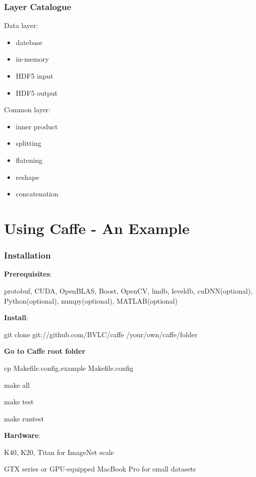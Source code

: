 \documentclass{beamer}
\begin{document}
\begin{frame}
\frametitle{Layer Catalogue}
Data layer:
\begin{itemize}
\item datebase
\item in-memory
\item HDF5 input
\item HDF5 output
\end{itemize}
Common layer:
\begin{itemize}
\item inner product
\item splitting
\item flatening
\item reshape
\item concatenation
\end{itemize}
\end{frame}

\section{Using Caffe - An Example}
\begin{frame}
\frametitle{Installation}
\textbf{Prerequisites}:\par
\hspace{30pt}protobuf, CUDA, OpenBLAS, Boost, OpenCV, lmdb, leveldb, cuDNN(optional), Python(optional), numpy(optional), MATLAB(optional)\par
\vspace{5pt}
\textbf{Install}:\par
\hspace{30pt}git clone git://github.com/BVLC/caffe /your/own/caffe/folder\par
\vspace{5pt}
\textbf{Go to Caffe root folder}\par
\hspace{30pt}cp Makefile.config.example Makefile.config\par
\hspace{30pt}make all\par
\hspace{30pt}make test\par
\hspace{30pt}make runtest\par
\vspace{5pt}
\textbf{Hardware}:\par
\hspace{30pt}K40, K20, Titan for ImageNet scale\par
\hspace{30pt}GTX series or GPU-equipped MacBook Pro for small datasets
\end{frame}
\end{document}
